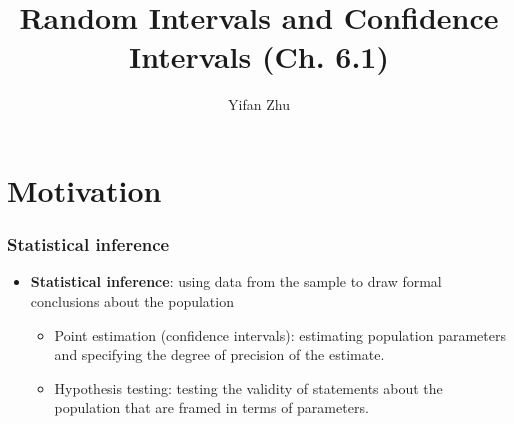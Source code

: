 \documentclass[handout]{beamer}\usepackage[]{graphicx}\usepackage[]{color}
\title{Random Intervals and Confidence Intervals (Ch. 6.1)}
\author{Yifan Zhu}
\date{}
\institute{Iowa State University}
\numberwithin{equation}{section}
\begin{document}
\begin{frame}
\titlepage
 \end{frame}
 

\section{Motivation}

\begin{frame}
\frametitle{Statistical inference}
\begin{itemize}
\item {\bf Statistical inference}: using data from the sample to draw formal conclusions about the population 
\begin{itemize}
\pause \item Point estimation (confidence intervals): estimating population parameters and specifying the degree of precision of the estimate.
\pause \item Hypothesis testing: testing the validity of statements about the population that are framed in terms of parameters. 
\end{itemize}
\end{itemize}
\end{frame}
\end{document}
